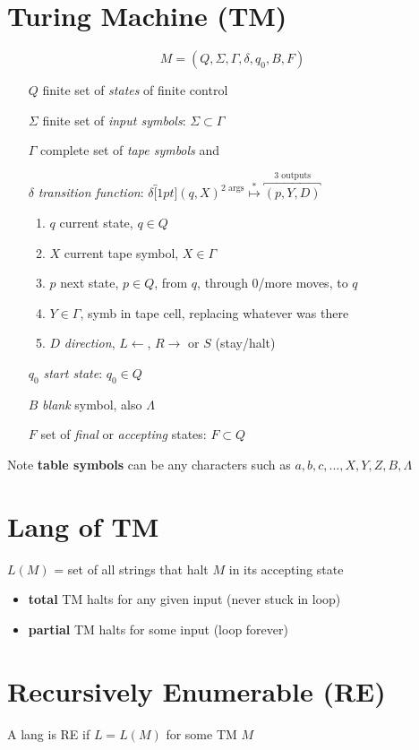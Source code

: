 \documentclass[10pt,a4paper,landscape]{article}
\begin{document}
\begin{multicols*}{3}
\section*{Turing Machine (TM)}
\vspace{0.5em}
\[
M = (Q,\Sigma,\Gamma,\delta,q_{0},B,F)
\]
\begin{itemize}
\item[$Q$] finite set of \emph{states} of finite control
\item[$\Sigma$] finite set of \emph{input symbols}: \(\Sigma \subset \Gamma\)
\item[$\Gamma$] complete set of \emph{tape symbols} and
\item[$\delta$] \emph{transition function}:
  \(
\delta\overbracket[1pt]{(q,X)}^\text{2 args} \overset{*}{\mapsto} \overbracket{(p,Y,D)}^\text{3 outputs}
  \)
  \begin{enumerate}
    \item \(q\) current state, \(q \in Q\)
    \item \(X\) current tape symbol, \(X \in \Gamma\)
    \item \(p\) next state, \(p \in Q\), from \(q\), through 0/more moves, to \(q\)
    \item \(Y \in \Gamma\), symb in tape cell, replacing whatever was there
    \item \(D\) \emph{direction}, \(L \leftarrow\), \(R \rightarrow\) or \(S\) (stay/halt)
 \end{enumerate}
\item[$q_{0}$] \emph{start state}: \(q_{0} \in Q\)
\item[$B$] \emph{blank} symbol, also \(\Lambda\)
\item[$F$] set of \emph{final} or \emph{accepting} states: \(F \subset Q\)
\end{itemize}
% 
Note \textbf{table symbols} can be any characters such as \(a,b,c,\ldots,X,Y,Z,B,\Lambda\)
\section*{Lang of TM}
\(L(M)\) = set of all strings that halt \(M\) in its accepting state
\begin{itemize}
\item \textbf{total} TM halts for any given input (never stuck in loop)
\item \textbf{partial} TM halts for some input (loop forever)
\end{itemize}
\section*{Recursively Enumerable (RE)}
A lang is RE if \(L = L(M)\) for some TM \(M\)


\end{multicols*}
\end{document}
